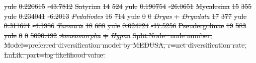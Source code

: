 \documentclass[10pt,letterpaper]{article} %
\providecommand{\DIFdel}[1]{{\protect\color{red}\sout{#1}}}                      %
\begin{document}
\DIFdel{yule  }%
\DIFdel{0.220615   }%
\DIFdel{-43.7812   }%
\DIFdel{Satyrina                                                   }%
\DIFdel{14              }%
\DIFdel{524        }%
\DIFdel{yule  }%
\DIFdel{0.190754   }%
\DIFdel{-26.0651   }%
\DIFdel{Mycalesina                                                 }%
\DIFdel{15              }%
\DIFdel{355        }%
\DIFdel{yule  }%
\DIFdel{0.234041   }%
\DIFdel{-6.2013    }%
\emph{\DIFdel{Pedaliodes}}                                          %
\DIFdel{16              }%
\DIFdel{714        }%
\DIFdel{yule  }%
\DIFdel{0          }%
\DIFdel{0          }%
\emph{\DIFdel{Dryas}} %
\DIFdel{+ }\emph{\DIFdel{Dryadula}}                             %
\DIFdel{17              }%
\DIFdel{377        }%
\DIFdel{yule  }%
\DIFdel{0.311671   }%
\DIFdel{-4.1986    }%
\emph{\DIFdel{Taenaris}}                                            %
\DIFdel{18              }%
\DIFdel{688        }%
\DIFdel{yule  }%
\DIFdel{0.024724   }%
\DIFdel{-17.5256   }%
\DIFdel{Pseudergolinae                                             }%
\DIFdel{19              }%
\DIFdel{583        }%
\DIFdel{yule  }%
\DIFdel{0          }%
\DIFdel{0          }%
\DIFdel{5090.492 }%
\emph{\DIFdel{Anaeomorpha}} %
\DIFdel{+ }\emph{\DIFdel{Hypna}}                                       
\DIFdel{Split.Node=node number, Model=preferred diversification model by MEDUSA, r=net diversification rate, LnLik. part=log likelihood value. }%
\end{document}
